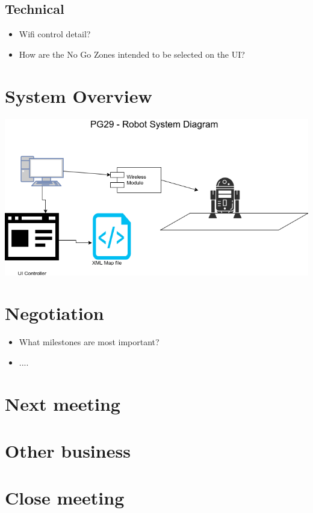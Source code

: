 \documentclass[11pt, a4paper]{article}
\begin{document}
\subsection{Technical}
\begin{itemize}
\item Wifi control detail?
\item How are the No Go Zones intended to be selected on the UI?
\end{itemize}

\section{System Overview}
\includegraphics[width=\textwidth]{system-flowchart}

\section{Negotiation}
\begin{itemize}
	\item What milestones are most important?
	\item ....
\end{itemize}

\section{Next meeting}

\section{Other business}

\section {Close meeting}
\vspace*{10pt}
\end{document}
